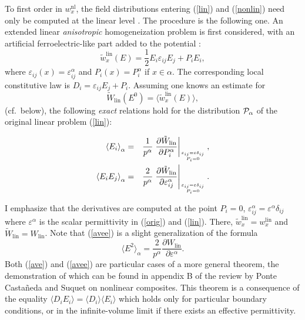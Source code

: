 To first order in $w_x^{\text{nl}}$, the field distributions entering 
(\ref{lin}) and (\ref{nonlin}) need only be computed at the linear 
level \cite{AHAR87,STRO88}. The procedure is the following one. An 
extended linear {\em anisotropic} homogeneization problem is first 
considered, with an artificial ferroelectric-like part added to the 
potential \cite{PONT97}:
\begin{equation}
\label{ferroel}
\tilde{w}^{\text{lin}}_x(E)=\frac{1}{2} E_i\varepsilon_{ij} E_j+ 
P_{i} E_i, 
\end{equation}
where $\varepsilon_{ij}(x)=\varepsilon^\alpha_{ij}$ and $P_i(x)=
P_i^\alpha$ if $x\in\alpha$. The corresponding local constitutive 
law is $D_i=\varepsilon_{ij} E_j+P_i$. Assuming one knows an estimate 
for
\begin{equation}
\tilde{W}_{\text{lin}}(E^0)=\langle \tilde{w}^{\text{lin}}_x(E)\rangle,
\end{equation}
(cf.\ below), the following {\em exact} relations hold for the distribution 
${\cal P}_\alpha$ of the original linear problem (\ref{lin}):
\begin{mathletters}
\label{avfield}
\begin{eqnarray}
\label{ave}
\left\langle E_i\right\rangle_{\alpha}&=&\frac{1}{p^\alpha}\left. 
\frac{\partial \tilde{W}_{\text{lin}}}{\partial P^\alpha_i}
\right|_{\varepsilon_{ij}=\varepsilon \delta_{ij}\atop P_i=0},\\ 
\label{avee}
\left\langle E_i E_j\right\rangle_{\alpha}&=&\frac{2}{p^\alpha}
\left.\frac{\partial \tilde{W}_{\text{lin}}}{\partial
\varepsilon^\alpha_{ij}}\right|_{\varepsilon_{ij}=\varepsilon 
\delta_{ij}\atop P_i=0}.
\end{eqnarray}
\end{mathletters}
I emphasize that the derivatives are computed at the point $P_i=0$, 
$\varepsilon^\alpha_{ij}=\varepsilon^\alpha \delta_{ij}$ where 
$\varepsilon^\alpha$ is the scalar permittivity in (\ref{orig}) 
and (\ref{lin}). There, $\tilde{w}^{\text{lin}}_x=w^{\text{lin}}_x$ 
and $\tilde{W}_{\text{lin}}=W_{\text{lin}}$. Note that (\ref{avee}) 
is a slight generalization of the formula \cite{BERG78}
\begin{equation}
\label{derivscal}
\langle E^2\rangle_\alpha=\frac{2}{p^\alpha}\frac{\partial 
W_{\text{lin}}}{\partial\varepsilon^\alpha}.
\end{equation}
Both (\ref{ave}) and (\ref{avee}) are particular cases of a more 
general theorem, the demonstration of which can be found in appendix 
B of the review by Ponte Casta\~neda and Suquet on nonlinear 
composites\cite{PONT98}. This theorem is a consequence of the 
equality $\langle D_i E_i\rangle=\langle D_i\rangle \langle E_i\rangle$ 
which holds only for particular boundary conditions, or in the 
infinite-volume limit if there exists an effective permittivity.  

